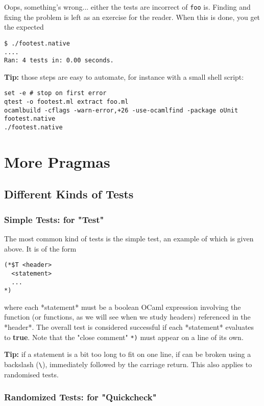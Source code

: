 \documentclass[a4paper,12pt]{article}
\begin{document}
Oops, something's wrong... either the tests are incorrect of \texttt{foo} is. Finding and fixing
the problem is left as an exercise for the reader. When this is done, you get the expected

\begin{verbatim}
$ ./footest.native
....
Ran: 4 tests in: 0.00 seconds.
\end{verbatim}

\textbf{Tip:} those steps are easy to automate, for instance with a small shell script:


\begin{verbatim}
set -e # stop on first error
qtest -o footest.ml extract foo.ml
ocamlbuild -cflags -warn-error,+26 -use-ocamlfind -package oUnit footest.native
./footest.native
\end{verbatim} 
\Overbatim
    
\section{More \qtest{} Pragmas}

\subsection{Different Kinds of Tests}
    
\subsubsection{Simple Tests:  for "Test"}

The most common kind of tests is the simple test, an example of which is given above. It
is of the form

\begin{verbatim}
(*$T <header>
  <statement>
  ...
*)
\end{verbatim}

where each *statement* must be a boolean OCaml expression involving the function (or
functions, as we will see when we study headers) referenced in the *header*.
The overall test is considered successful if each *statement* evaluates to \textbf{true}. Note
that the "close comment" \texttt{*)} must appear on a line of its own.

\textbf{Tip:} if a statement is a bit too long to fit on one line, if can be broken using a
backslash (\texttt{\backslash}), immediately followed by the carriage return. This also applies to
randomised tests.

\subsubsection{Randomized Tests:  for "Quickcheck"}
\end{document}
